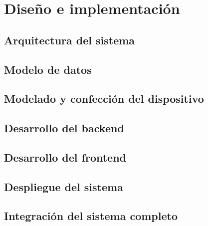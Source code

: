 \chapter{Diseño e implementación} %

\section{Arquitectura del sistema}


\section{Modelo de datos}


\section{Modelado y confección del dispositivo }


\section{Desarrollo del backend}


\section{Desarrollo del frontend}


\section{Despliegue del sistema}


\section{Integración del sistema completo}

